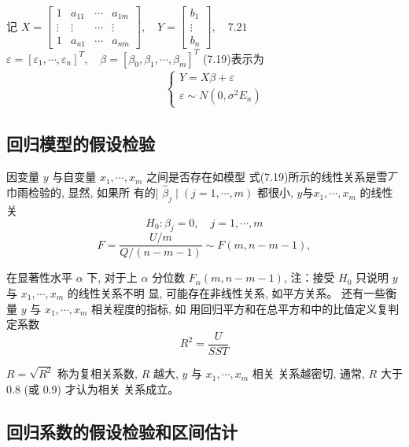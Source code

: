 记 \( X=\left[\begin{array}{cccc}1 & a_{11} & \cdots & a_{1 m} \\ \vdots & \vdots & \cdots & \vdots \\ 1 & a_{n 1} & \cdots & a_{n m}\end{array}\right], \quad Y=\left[\begin{array}{c}b_{1} \\ \vdots \\ b_{n}\end{array}\right], \quad {7 . 2 1} \)
\( \varepsilon=\left[\varepsilon_{1}, \cdots, \varepsilon_{n}\right]^{T}, \quad \beta=\left[\beta_{0}, \beta_{1}, \cdots, \beta_{m}\right]^{T} \)
(7.19)表示为
$$
\begin{array}{l}

\qquad\left\{\begin{array}{l}
{Y}={X} {\beta}+{\varepsilon} \\
{\varepsilon} \sim {N}\left({0}, \sigma^{2} {E}_{n}\right)
\end{array}\right.
\end{array}
$$

\subsection{回归模型的假设检验}

因变量 \( y \) 与自变量 \( x_{1}, \cdots, x_{m} \) 之间是否存在如模型 式(7.19)所示的线性关系是雪丆巾雨检验的, 显然, 如果所 有的| \( \hat{\beta}_{j} \mid(j=1, \cdots, m) \) 都很小, \( y 与 x_{1}, \cdots, x_{m} \) 的线性关
$$
H_{0}: \beta_{j}=0, \quad j=1, \cdots, m
$$
$$
F=\frac{U / m}{Q /(n-m-1)} \sim F(m, n-m-1),
$$

在显著性水平 \( \alpha \) 下, 对于上 \( \alpha \) 分位数 \( {F}_{\alpha}({m}, {n}-{m}-{1}) \),
注：接受 \( {H}_{0} \) 只说明 \( {y} \) 与 \( {x}_{1}, \cdots, {x}_{m} \) 的线性关系不明
显, 可能存在非线性关系, 如平方关系。  还有一些衡量 \( y \) 与 \( x_{1}, \cdots, x_{m} \) 相关程度的指标, 如 用回归平方和在总平方和中的比值定义复判定系数
$$
{R}^{2}=\frac{{U}}{{S S T}}
$$

\( {R}=\sqrt{{R}^{2}} \) 称为复相关系数, \( {R} \) 越大, \( {y} \) 与 \( {x}_{1}, \cdots, {x}_{m} \) 相关
关系越密切, 通常,  \( {R} \) 大于 \( 0.8 \) (或 0.9) 才认为相关
关系成立。 

\subsection{回归系数的假设检验和区间估计}

